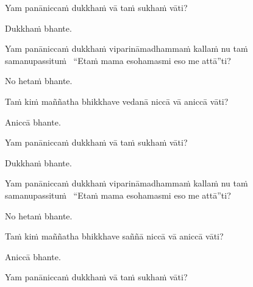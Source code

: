 \begin{pali-hangtogether}
  Yam panāniccaṁ dukkhaṁ vā taṁ sukhaṁ vāti?
\end{pali-hangtogether}

\begin{pali-hangtogether}
  Dukkhaṁ bhante.
\end{pali-hangtogether}

\begin{pali-hangtogether}
  Yam panāniccaṁ dukkhaṁ viparināmadhammaṁ kallaṁ nu taṁ samanupassituṁ \breathmark\ ``Etaṁ mama esohamasmi eso me attā''ti?
\end{pali-hangtogether}

\begin{pali-hangtogether}
  No hetaṁ bhante.
\end{pali-hangtogether}

\begin{pali-hang}
  Taṁ kiṁ maññatha bhikkhave vedanā niccā vā aniccā vāti?
\end{pali-hang}

\begin{pali-hangtogether}
  Aniccā bhante.
\end{pali-hangtogether}

\begin{pali-hangtogether}
  Yam panāniccaṁ dukkhaṁ vā taṁ sukhaṁ vāti?
\end{pali-hangtogether}

\begin{pali-hangtogether}
  Dukkhaṁ bhante.
\end{pali-hangtogether}

\begin{pali-hangtogether}
  Yam panāniccaṁ dukkhaṁ viparināmadhammaṁ kallaṁ nu taṁ samanupassituṁ \breathmark\ ``Etaṁ mama esohamasmi eso me attā''ti?
\end{pali-hangtogether}

\begin{pali-hangtogether}
  No hetaṁ bhante.
\end{pali-hangtogether}

\begin{pali-hang}
  Taṁ kiṁ maññatha bhikkhave saññā niccā vā aniccā vāti?
\end{pali-hang}

\begin{pali-hangtogether}
  Aniccā bhante.
\end{pali-hangtogether}

\begin{pali-hangtogether}
  Yam panāniccaṁ dukkhaṁ vā taṁ sukhaṁ vāti?
\end{pali-hangtogether}

